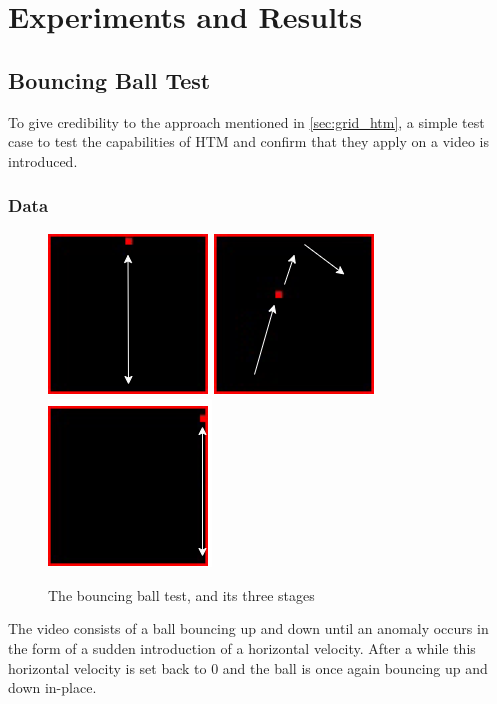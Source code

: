 \chapter{Experiments and Results}

\section{Bouncing Ball Test}
To give credibility to the approach mentioned in \autoref{sec:grid_htm}, a simple test case to test the capabilities of HTM and confirm that they apply on a video is introduced.
\subsection{Data}
\begin{figure}[H]
    \centering
    \includegraphics[width=.3\textwidth]{resources/experiments/bouncing_ball/bb_updown1.png}\hfill
    \includegraphics[width=.3\textwidth]{resources/experiments/bouncing_ball/bb_updownside.png}\hfill
    \includegraphics[width=.3\textwidth]{resources/experiments/bouncing_ball/bb_updown2.png}
    \caption{The bouncing ball test, and its three stages}
    \label{fig:bb}
\end{figure}
The video consists of a ball bouncing up and down until an anomaly occurs in the form of a sudden introduction of a horizontal velocity. After a while this horizontal velocity is set back to 0 and the ball is once again bouncing up and down in-place.
\par
